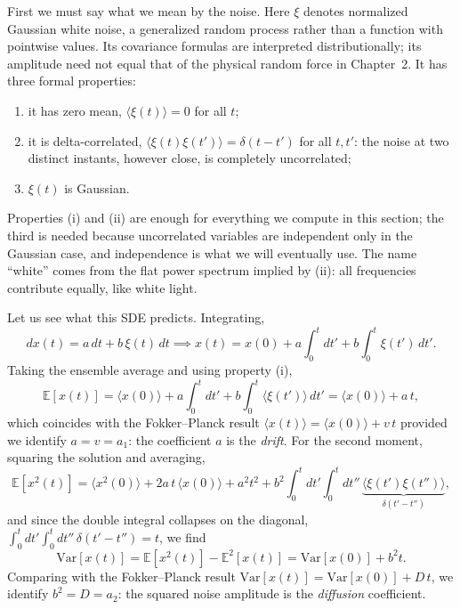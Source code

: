 First we must say what we mean by the noise.
Here $\xi$ denotes normalized Gaussian white noise, a generalized random process rather than a function with pointwise values.
Its covariance formulas are interpreted distributionally; its amplitude need not equal that of the physical random force in Chapter~2.
It has three formal properties:
\begin{enumerate}[label=(\roman*)]
    \item it has zero mean, $\langle\xi(t)\rangle = 0$ for all $t$;
    \item it is delta-correlated, $\langle\xi(t)\xi(t')\rangle = \delta(t-t')$ for all $t,t'$: the noise at two distinct instants, however close, is completely uncorrelated;
    \item $\xi(t)$ is Gaussian.
\end{enumerate}
Properties (i) and (ii) are enough for everything we compute in this section; the third is needed because uncorrelated variables are independent only in the Gaussian case, and independence is what we will eventually use.
The name ``white'' comes from the flat power spectrum implied by (ii): all frequencies contribute equally, like white light.

Let us see what this SDE predicts.
Integrating,
\begin{equation}
dx(t) = a\,dt + b\,\xi(t)\,dt \implies x(t) = x(0) + a\int_0^t dt' + b\int_0^t \xi(t')\,dt'.
\end{equation}
Taking the ensemble average and using property (i),
\begin{equation}
\mathbb{E}[x(t)] = \langle x(0)\rangle + a\int_0^t dt' + b\int_0^t \langle\xi(t')\rangle\,dt' = \langle x(0)\rangle + a\,t,
\end{equation}
which coincides with the Fokker--Planck result $\langle x(t)\rangle = \langle x(0)\rangle + v\,t$ provided we identify $a=v=a_1$: the coefficient $a$ is the \emph{drift}.
For the second moment, squaring the solution and averaging,
\begin{equation}
\mathbb{E}[x^2(t)] = \langle x^2(0)\rangle + 2a\,t\,\langle x(0)\rangle + a^2 t^2 + b^2\int_0^t dt'\int_0^t dt''\,\underbrace{\langle\xi(t')\xi(t'')\rangle}_{\delta(t'-t'')},
\end{equation}
and since the double integral collapses on the diagonal, $\int_0^t dt'\int_0^t dt''\,\delta(t'-t'') = t$, we find
\begin{equation}
\mathrm{Var}[x(t)] = \mathbb{E}[x^2(t)] - \mathbb{E}^2[x(t)] = \mathrm{Var}[x(0)] + b^2 t.
\end{equation}
Comparing with the Fokker--Planck result $\mathrm{Var}[x(t)] = \mathrm{Var}[x(0)] + D\,t$, we identify $b^2 = D = a_2$: the squared noise amplitude is the \emph{diffusion} coefficient.

